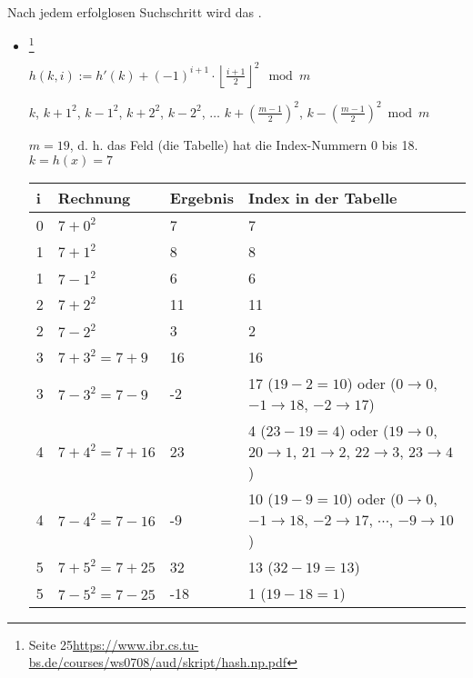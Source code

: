 \documentclass{lehramt-informatik-haupt}
\begin{document}
Nach jedem erfolglosen Suchschritt wird das .


\begin{itemize}

%

\item {}
\footnote{Seite 25\url{https://www.ibr.cs.tu-bs.de/courses/ws0708/aud/skript/hash.np.pdf}}


$h(k, i) := h'(k) + (-1)^{i+1} \cdot \left\lfloor \frac{i+1}{2}\right\rfloor ^2 \mod m$

$k$, $k+1^2$, $k-1^2$, $k+2^2$, $k-2^2$,
$\ldots$
$k+(\frac{m-1}{2})^2$, $k-(\frac{m-1}{2})^2 \bmod m$


$m=19$, d. h. das Feld (die Tabelle) hat die Index-Nummern 0 bis 18.
$k = h(x) = 7$


\def\tmp#1{{\tiny#1}}

\begin{tabular}{|l|l|l|l|}
i & Rechnung & Ergebnis & Index in der Tabelle\\\hline\hline
0 & $7 + 0^2$ & 7 & 7\\
1 & $7 + 1^2$ & 8 & 8\\
1 & $7 - 1^2$ & 6 & 6\\
2 & $7 + 2^2$ & 11 & 11\\
2 & $7 - 2^2$ & 3 & 2 \\
3 & $7 + 3^2 = 7 + 9$  & 16 & 16 \\

3 & $7 - 3^2 = 7 - 9$  & -2 &
17 \tmp{($19-2=10$) oder ($0 \rightarrow 0$, $-1 \rightarrow 18$, $-2 \rightarrow 17$)}
\\

4 & $7 + 4^2 = 7 + 16$  & 23 &
4 \tmp{($23-19=4$) oder ($19 \rightarrow 0$, $20 \rightarrow 1$, $21 \rightarrow 2$, $22 \rightarrow 3$, $23 \rightarrow 4$)}
\\

4 & $7 - 4^2 = 7 - 16$  & -9 &
10 \tmp{($19-9=10$) oder ($0 \rightarrow 0$, $-1 \rightarrow 18$, $-2 \rightarrow 17$, $\cdots$, $-9 \rightarrow 10$)}
\\

5 & $7 + 5^2 = 7 + 25$  & 32 & 13 \tmp{($32-19=13$)} \\
5 & $7 - 5^2 = 7 - 25$  & -18 & 1 \tmp{($19-18=1$)}\\
\end{tabular}


\end{itemize}
\end{document}
